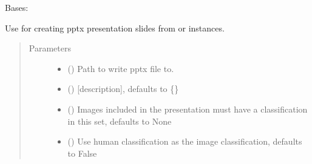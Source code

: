 \documentclass[letterpaper,10pt,english]{sphinxmanual}
\begin{document}
\begin{fulllineitems}
\label{\detokenize{polo.utils:polo.utils.io_utils.PptxWriter}}
Bases: 

Use for creating pptx presentation slides from 
or  instances.
\begin{quote}\begin{description}
\item[{Parameters}] \leavevmode\begin{itemize}
\item {} 
 () \textendash{} Path to write pptx file to.

\item {} 
 (\sphinxstyleliteralemphasis{\sphinxupquote{, }}) \textendash{} {[}description{]}, defaults to \{\}

\item {} 
 (\sphinxstyleliteralemphasis{\sphinxupquote{, }}) \textendash{} Images included in the presentation
must have a classification in this set, defaults to None

\item {} 
 (\sphinxstyleliteralemphasis{\sphinxupquote{, }}) \textendash{} Use human classification as the image classification, defaults to False


\end{itemize}
\end{description}
\end{quote}
\end{fulllineitems}
\end{document}
